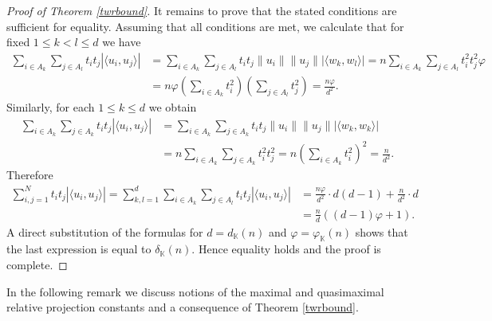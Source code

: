 \documentclass[12pt, reqno]{amsart}
\theoremstyle{definition}
\theoremstyle{remark}
\numberwithin{equation}{section}
\begin{document}
\begin{proof}[Proof of Theorem \ref{twrbound}]
It remains to prove that the stated conditions are sufficient for equality. Assuming that all conditions are met, we calculate that for fixed $1 \leq k < l \leq d$ we have
\begin{align*}
\sum_{i \in A_k} \sum_{j \in A_l} t_it_j |\langle u_i, u_j \rangle| &= \sum_{i \in A_k} \sum_{j \in A_l} t_it_j \|u_i\| \|u_j\| |\langle w_k, w_l \rangle| = n \sum_{i \in A_k} \sum_{j \in A_l} t_i^2 t_j^2 \varphi \\
&=n \varphi \left ( \sum_{i \in A_k} t_i^2 \right ) \left ( \sum_{j \in A_l} t_j^2 \right ) = \frac{n \varphi}{d^2}.
\end{align*}
Similarly, for each $1 \leq k \leq d$ we obtain
\begin{align*}
\sum_{i \in A_k} \sum_{j \in A_k} t_it_j |\langle u_i, u_j \rangle| &= \sum_{i \in A_k} \sum_{j \in A_k} t_it_j \|u_i\| \|u_j\| |\langle w_k, w_k \rangle|\\
&=n\sum_{i \in A_k} \sum_{j \in A_k} t_i^2 t_j^2 =n \left ( \sum_{i \in A_k} t_i^2 \right )^2 = \frac{n}{d^2}.
\end{align*}
Therefore
\begin{align*}
\sum_{i, j=1}^{N} t_it_j |\langle u_i, u_j \rangle| = \sum_{k, l=1}^{d} \sum_{i \in A_k} \sum_{j \in A_l} t_it_j |\langle u_i, u_j \rangle| &=\frac{n \varphi}{d^2} \cdot d(d-1) + \frac{n}{d^2} \cdot d\\
&=\frac{n}{d} \left ( (d-1) \varphi +  1 \right ).
\end{align*}
A direct substitution of the formulas for $d=d_{\mathbb K}(n)$ and $\varphi=\varphi_{\mathbb K}(n)$ shows that the last expression is equal to $\delta_{\mathbb K}(n)$. Hence equality holds and the proof is complete.

\end{proof}


In the following remark we discuss notions of the maximal and quasimaximal relative projection constants and a consequence of Theorem \ref{twrbound}.
\end{document}
